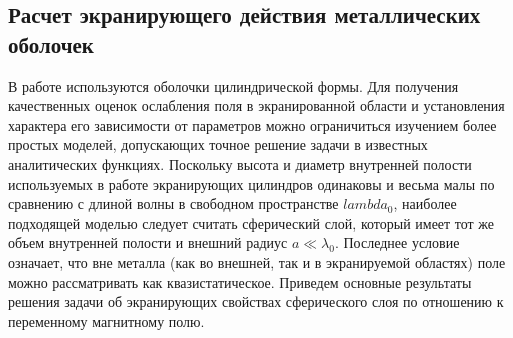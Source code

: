 




\subsection{Расчет экранирующего действия металлических оболочек}

В работе используются оболочки цилиндрической формы. Для получения качественных оценок ослабления поля в экранированной области и установления характера его зависимости от параметров можно ограничиться изучением более простых моделей, допускающих точное решение задачи в известных аналитических функциях. Поскольку высота и диаметр внутренней полости используемых в работе экранирующих цилиндров одинаковы и весьма малы по сравнению с длиной волны в свободном пространстве $lambda_0$, наиболее подходящей моделью следует считать сферический слой, который имеет тот же объем внутренней полости и внешний радиус $a \ll \lambda_0$. Последнее условие означает, что вне металла (как во внешней, так и в экранируемой областях) поле можно рассматривать как квазистатическое. Приведем основные результаты решения задачи об экранирующих свойствах сферического слоя по отношению к переменному магнитному полю. 

